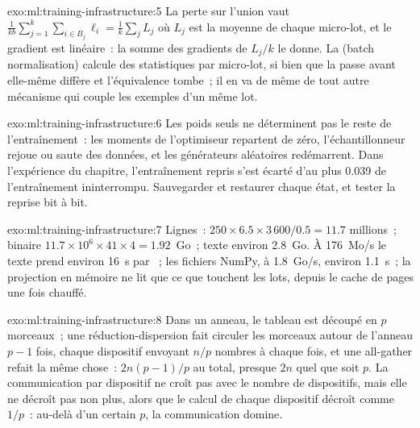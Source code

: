\begin{solution}{exo:ml:training-infrastructure:5}
La perte sur l'union vaut $\frac1{kb}\sum_{j=1}^k\sum_{i\in B_j}\ell_i = \frac1k\sum_jL_j$ où $L_j$ est la moyenne de chaque micro-lot, et
le gradient est linéaire~: la somme des gradients de $L_j/k$ le donne. La  (batch normalisation) calcule des statistiques par micro-lot, si bien que la
passe avant elle-même diffère et l'équivalence tombe~; il en va de même de tout autre mécanisme qui couple les exemples d'un même lot.
\end{solution}

\begin{solution}{exo:ml:training-infrastructure:6}
Les poids seuls ne déterminent pas le reste de l'entraînement~: les moments de l'optimiseur repartent de zéro, l'échantillonneur rejoue ou saute des données, et les
générateurs aléatoires redémarrent. Dans l'expérience du chapitre, l'entraînement repris s'est écarté d'au plus 0.039 de l'entraînement ininterrompu. Sauvegarder et
restaurer chaque état, et tester la reprise bit à bit.
\end{solution}

\begin{solution}{exo:ml:training-infrastructure:7}
Lignes~: $250\times6.5\times3\,600/0.5 = 11.7$ millions~; binaire $11.7\times10^6\times41\times4 = 1.92$~Go~; texte environ 2.8~Go. À 176~Mo/s
le texte prend environ 16~s par ~; les fichiers NumPy, à 1.8~Go/s, environ 1.1~s~; la projection en mémoire ne lit que ce que touchent les lots,
depuis le cache de pages une fois chauffé.
\end{solution}

\begin{solution}{exo:ml:training-infrastructure:8}
Dans un anneau, le tableau est découpé en $p$ morceaux~; une réduction-dispersion fait circuler les morceaux autour de l'anneau $p - 1$ fois, chaque dispositif envoyant
$n/p$ nombres à chaque fois, et une all-gather refait la même chose~: $2n(p-1)/p$ au total, presque $2n$ quel que soit $p$. La communication
par dispositif ne croît pas avec le nombre de dispositifs, mais elle ne décroît pas non plus, alors que le calcul de chaque dispositif décroît comme $1/p$~:
au-delà d'un certain $p$, la communication domine.
\end{solution}

